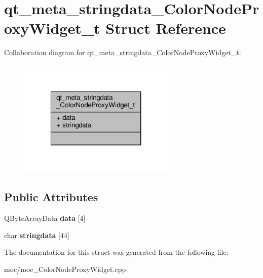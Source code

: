 \hypertarget{structqt__meta__stringdata___color_node_proxy_widget__t}{\section{qt\-\_\-meta\-\_\-stringdata\-\_\-\-Color\-Node\-Proxy\-Widget\-\_\-t Struct Reference}
\label{structqt__meta__stringdata___color_node_proxy_widget__t}
}


Collaboration diagram for qt\-\_\-meta\-\_\-stringdata\-\_\-\-Color\-Node\-Proxy\-Widget\-\_\-t\-:
\nopagebreak
\begin{figure}[H]
\begin{center}
\leavevmode
\includegraphics[width=212pt]{structqt__meta__stringdata___color_node_proxy_widget__t__coll__graph}
\end{center}
\end{figure}
\subsection*{Public Attributes}
\begin{DoxyCompactItemize}
\item 
\hypertarget{structqt__meta__stringdata___color_node_proxy_widget__t_a209e48dbe710459e4cf9a0178295f78e}{Q\-Byte\-Array\-Data {\bfseries data} \mbox{[}4\mbox{]}}\label{structqt__meta__stringdata___color_node_proxy_widget__t_a209e48dbe710459e4cf9a0178295f78e}

\item 
\hypertarget{structqt__meta__stringdata___color_node_proxy_widget__t_aa633a4921c4df548bfde6a77c9ac3ed5}{char {\bfseries stringdata} \mbox{[}44\mbox{]}}\label{structqt__meta__stringdata___color_node_proxy_widget__t_aa633a4921c4df548bfde6a77c9ac3ed5}

\end{DoxyCompactItemize}


The documentation for this struct was generated from the following file\-:\begin{DoxyCompactItemize}
\item 
moc/moc\-\_\-\-Color\-Node\-Proxy\-Widget.\-cpp\end{DoxyCompactItemize}
